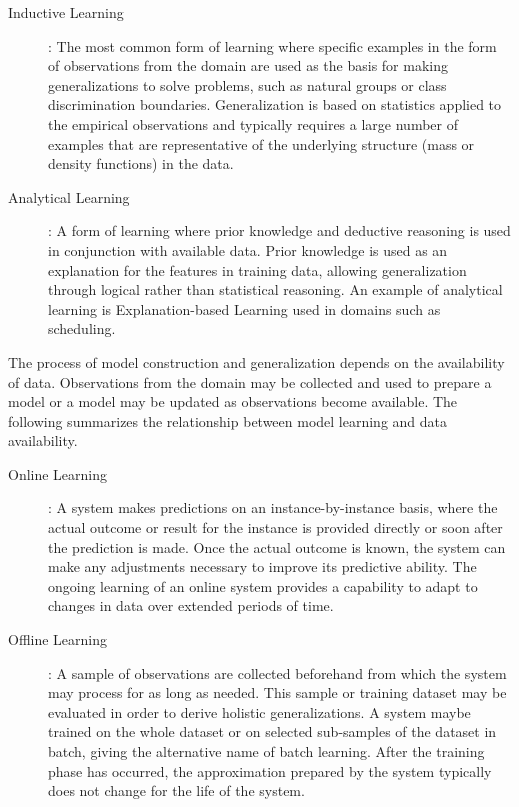 \documentclass[a4paper, 11pt]{article}
\begin{document}
\begin{description}
	\item[Inductive Learning]: The most common form of learning where specific examples in the form of observations from the domain are used as the basis for making generalizations to solve problems, such as natural groups or class discrimination boundaries. Generalization is based on statistics applied to the empirical observations and typically requires a large number of examples that are representative of the underlying structure (mass or density functions) in the data.
	
	\item[Analytical Learning]: A form of learning where prior knowledge and deductive reasoning is used in conjunction with available data. Prior knowledge is used as an explanation for the features in training data, allowing generalization through logical rather than statistical reasoning. An example of analytical learning is Explanation-based Learning used in domains such as scheduling.
	
\end{description}

The process of model construction and generalization depends on the availability of data. Observations from the domain may be collected and used to prepare a model or a model may be updated as observations become available. The following summarizes the relationship between model learning and data availability.

\begin{description}
	\item[Online Learning]: A system makes predictions on an instance-by-instance basis, where the actual outcome or result for the instance is provided directly or soon after the prediction is made. Once the actual outcome is known, the system can make any adjustments necessary to improve its predictive ability. The ongoing learning of an online system provides a capability to adapt to changes in data over extended periods of time.
	
	\item[Offline Learning]: A sample of observations are collected beforehand from which the system may process for as long as needed. This sample or training dataset may be evaluated in order to derive holistic generalizations. A system maybe trained on the whole dataset or on selected sub-samples of the dataset in batch, giving the alternative name of batch learning. After the training phase has occurred, the approximation prepared by the system typically does not change for the life of the system.

\end{description}
\end{document}
